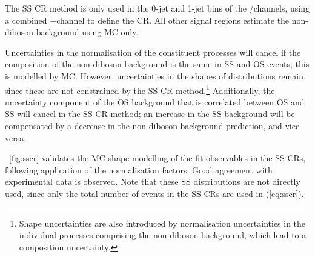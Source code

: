 The SS CR method is only used in the 0-jet and 1-jet bins of the \emch/\mech channels, 
using a combined \emch{}+\mech channel to define the CR. All other signal 
regions estimate the non-\WW diboson background using MC only.

Uncertainties in the normalisation of the constituent processes will cancel if the 
composition of the non-\WW diboson background is the same in SS and OS events; this is 
modelled by MC. However, uncertainties in the shapes of distributions remain, since these 
are not constrained by the SS CR method.\footnote{
	Shape uncertainties are also introduced by normalisation uncertainties in the individual processes comprising the non-\WW diboson background, which lead to a composition 
	uncertainty.
} 
Additionally, the uncertainty component of the OS \Wjets background that is correlated 
between OS and SS will cancel in the SS CR method; an increase in the SS \Wjets background 
will be compensated by a decrease in the non-\WW diboson background prediction, and vice 
versa.

\Figure~\ref{fig:sscr} validates the MC shape modelling of the fit observables in the SS 
CRs, following application of the normalisation factors. Good agreement with experimental 
data is observed. Note that these SS distributions are not directly used, since only the 
total number of events in the SS CRs are used in (\ref{eq:sscr}).

